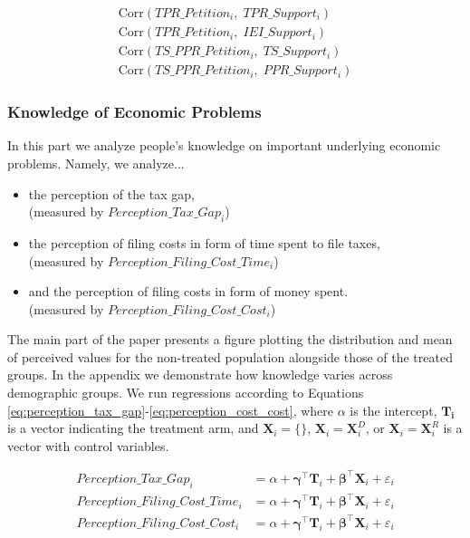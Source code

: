 \documentclass[11pt]{article}
\begin{document}
\begin{align}
\label{eq:corr_tpr_petition_tpr_support}
\mathrm{Corr}\!\left( TPR\_Petition_i,\; TPR\_Support_i \right) \\
\label{eq:corr_tpr_petition_iei_support}
\mathrm{Corr}\!\left(TPR\_Petition_i,\; IEI\_Support_i \right) \\
\label{eq:corr_ts_ppr_petition_ts_support}
\mathrm{Corr}\!\left( TS\_PPR\_Petition_i,\; TS\_Support_i \right) \\
\label{eq:corr_ts_ppr_petition_ppr_support}
\mathrm{Corr}\!\left( TS\_PPR\_Petition_i,\; PPR\_Support_i \right)
\end{align}


\subsubsection{Knowledge of Economic Problems}
In this part we analyze people's knowledge on important underlying economic problems. Namely, we analyze...
\begin{itemize}
    \item the perception of the tax gap, \\(measured by $Perception\_Tax\_Gap_i$)
    \item the perception of filing costs in form of time spent to file taxes, \\(measured by $Perception\_Filing\_Cost\_Time_i$)
    \item and the perception of filing costs in form of money spent. \\(measured by $Perception\_Filing\_Cost\_Cost_i$)
\end{itemize}
The main part of the paper presents a figure plotting the distribution and mean of perceived values for the non-treated population alongside those of the treated groups. In the appendix we demonstrate how knowledge varies across demographic groups. We run regressions according to Equations \ref{eq:perception_tax_gap}-\ref{eq:perception_cost_cost}, where $\alpha$ is the intercept, $\mathbf{T_i}$ is a vector indicating the treatment arm, and $\mathbf{X}_{i} = \{\}$, $\mathbf{X}_{i} = \mathbf{X}_{i}^{D}$, or  $\mathbf{X}_{i} = \mathbf{X}_{i}^{R}$ is a vector with control variables. 

\begin{center}
\begin{align}
    \label{eq:perception_tax_gap}
    \text{$Perception\_Tax\_Gap_i$} 
    &= \alpha + \boldsymbol{\gamma}^{\top}\mathbf{T}_i + \boldsymbol{\beta}^{\top}\mathbf{X}_{i} + \varepsilon_{i} \\[0.25em]
    \text{$Perception\_Filing\_Cost\_Time_i$} 
    &= \alpha + \boldsymbol{\gamma}^{\top}\mathbf{T}_i + \boldsymbol{\beta}^{\top}\mathbf{X}_{i} +  \varepsilon_{i} \\[0.25em]
    \label{eq:perception_cost_cost}
    \text{$Perception\_Filing\_Cost\_Cost_i$} 
    &= \alpha + \boldsymbol{\gamma}^{\top}\mathbf{T}_i + \boldsymbol{\beta}^{\top}\mathbf{X}_{i} + \varepsilon_{i} 
\end{align}
\end{center}
\end{document}
